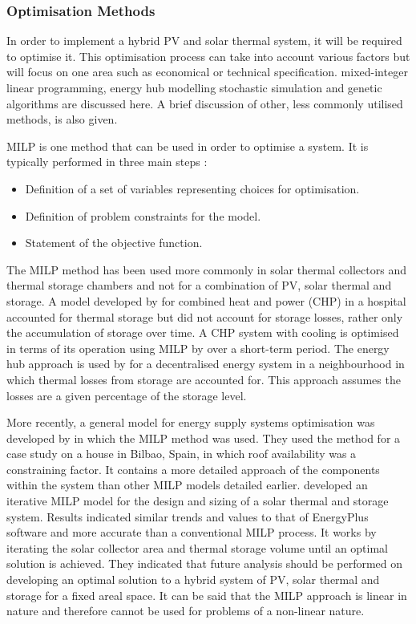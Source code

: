 \subsubsection{Optimisation Methods}

In order to implement a hybrid PV and solar thermal system, it will be 
required to optimise it. This optimisation process can take into account 
various factors but will focus on one area such as economical or technical 
specification. mixed-integer linear programming, energy 
hub modelling stochastic simulation and genetic algorithms are discussed here. A brief 
discussion of other, less commonly utilised methods, is also given.

MILP is one method that can be used in order to optimise a system. 
It is typically performed in three main steps \cite{Colesmith}: 
\begin{itemize}
  \item Definition of a set of variables representing choices for optimisation. 
  \item Definition of problem constraints for the model.
  \item Statement of the objective function.
\end{itemize}

The MILP method has been used more commonly in solar thermal collectors and 
thermal storage chambers and not for a combination of PV, solar thermal and 
storage. A model developed by \cite{COSTA2014921} for combined heat and power (CHP) in a 
hospital accounted for thermal storage but did not account for storage losses, 
rather only the accumulation of storage over time. A CHP system with cooling 
is optimised in terms of its operation using MILP by \cite{BISCHI201412} over a short-term 
period. The energy hub approach is used by \cite{OREHOUNIG2015277} for a decentralised energy 
system in a neighbourhood in which thermal losses from storage are accounted 
for. This approach assumes the losses are a given percentage of the storage 
level. 

More recently, a general model for energy supply systems optimisation was 
developed by \cite{ITURRIAGA2017954} in which the MILP method was used. They used the method for 
a case study on a house in Bilbao, Spain, in which roof availability was a 
constraining factor. It contains a more detailed approach of the components 
within the system than other MILP models detailed earlier. \cite{OMU2016313} developed an 
iterative MILP model for the design and sizing of a solar thermal and storage 
system. Results indicated similar trends and values to that of EnergyPlus 
software and more accurate than a conventional MILP process. It works by 
iterating the solar collector area and thermal storage volume until an 
optimal solution is achieved. They indicated that future analysis should be 
performed on developing an optimal solution to a hybrid system of PV, solar 
thermal and storage for a fixed areal space. It can be said that the MILP 
approach is linear in nature and therefore cannot be used for problems of a 
non-linear nature.


